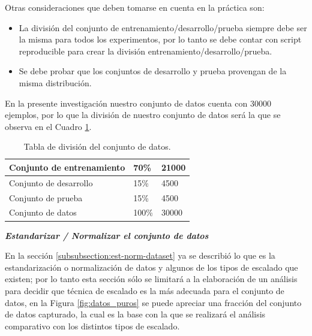 \vspace{5mm} %

Otras consideraciones que deben tomarse en cuenta en la pr\'{a}ctica son:

\begin{itemize}
\item La divisi\'{o}n del conjunto de entrenamiento/desarrollo/prueba siempre debe ser la misma para todos los experimentos, por lo tanto se debe contar con script reproducible para crear la divisi\'{o}n entrenamiento/desarrollo/prueba.
\item Se debe probar que los conjuntos de desarrollo y prueba provengan de la misma distribuci\'{o}n.
\end{itemize}

En la presente investigaci\'{o}n nuestro conjunto de datos cuenta con 30000 ejemplos, por lo que la divisi\'{o}n de nuestro conjunto de datos ser\'{a} la que se observa en el Cuadro \ref{table:division-dataset}.


\begin{table}[]
\centering
\begin{tabular}{|l|l|l|}
\hline
Conjunto de entrenamiento & 70\%  & 21000 \\ \hline
Conjunto de desarrollo    & 15\%  & 4500  \\ \hline
Conjunto de prueba        & 15\%  & 4500  \\ \hline
Conjunto de datos         & 100\% & 30000 \\ \hline
\end{tabular}
\caption{Tabla de divisi\'{o}n del conjunto de datos.}
\label{table:division-dataset}
\end{table}

\vspace{5mm} %

\textbf{\textit{Estandarizar / Normalizar el conjunto de datos}}

\vspace{5mm} %

En la secci\'{o}n \ref{subsubsection:est-norm-dataset} ya se describi\'{o} lo que es la estandarizaci\'{o}n o normalizaci\'{o}n de datos y algunos de los tipos de escalado que existen; por lo tanto esta secci\'{o}n s\'{o}lo se limitar\'{a} a la elaboraci\'{o}n de un an\'{a}lisis para decidir que t\'{e}cnica de escalado es la m\'{a}s adecuada para el conjunto de datos, en la Figura \ref{fig:datos_puros} se puede apreciar una fracci\'{o}n del conjunto de datos capturado, la cual es la base con la que se realizar\'{a} el an\'{a}lisis comparativo con los distintos tipos de escalado.

